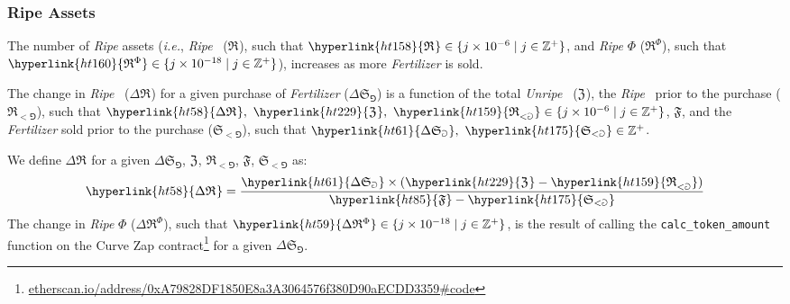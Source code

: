 \documentclass[tikz]{article}
\newcommand{\code}[1]{\texttt{#1}}
\newcommand{\term}[1]{\textsl{#1}}
\newcommand{\fref}[1]{\footnote{\href{http://#1}{#1}}}
\newcommand{\Bean}{} %
\newcommand{\bean}{} %
\begin{document}
\subsubsection{Ripe Assets}
The number of \term{Ripe} assets (\term{i.e.}, \term{Ripe} \Bean\ (\hyperlink{ht158}{$\mathfrak{R}^{\bean}$}), such that $\hyperlink{ht158}{\mathfrak{R}^{\bean}} \in \{j \times 10^{-6} \mid j \in \mathbb{Z}^{+} \}$, and \term{Ripe} \hyperlink{ht187}{$\Phi$} (\hyperlink{ht160}{$\mathfrak{R}^{\Phi}$}), such that $\hyperlink{ht160}{\mathfrak{R}^{\Phi}} \in \{j \times 10^{-18} \mid j \in \mathbb{Z}^{+} \}$), increases as more \term{Fertilizer} is sold.

The change in \term{Ripe} \Bean\ (\hyperlink{ht58}{$\Delta \mathfrak{R}^{\bean}$}) for a given purchase of \term{Fertilizer} (\hyperlink{ht61}{$\Delta \mathfrak{S}_{\Game}$}) is a function of the total \term{Unripe} \Bean\ (\hyperlink{ht229}{$\mathfrak{Z}^{\bean}$}), the \term{Ripe} \Bean\ prior to the purchase (\hyperlink{ht159}{$\mathfrak{R}_{<\Game}^{\bean}$}),  such that $\hyperlink{ht58}{\Delta \mathfrak{R}^{\bean}},\ \hyperlink{ht229}{\mathfrak{Z}^{\bean}},\ \hyperlink{ht159}{\mathfrak{R}_{<\Game}^{\bean}} \in \{j \times 10^{-6} \mid j \in \mathbb{Z}^{+} \}$, \hyperlink{ht85}{$\mathfrak{F}$}, and the \term{Fertilizer} sold prior to the purchase (\hyperlink{ht175}{$\mathfrak{S}_{<\Game}$}),  such that $\hyperlink{ht61}{\Delta \mathfrak{S}_{\Game}},\ \hyperlink{ht175}{\mathfrak{S}_{<\Game}} \in \mathbb{Z}^{+}$.

We define \hyperlink{ht58}{$\Delta \mathfrak{R}^{\bean}$} for a given \hyperlink{ht61}{$\Delta \mathfrak{S}_{\Game}$}, \hyperlink{ht229}{$\mathfrak{Z}^{\bean}$}, \hyperlink{ht159}{$\mathfrak{R}_{<\Game}^{\bean}$}, \hyperlink{ht85}{$\mathfrak{F}$}, \hyperlink{ht175}{$\mathfrak{S}_{<\Game}$} as:
$$\hyperlink{ht58}{\Delta \mathfrak{R}^{\bean}} = \frac{\hyperlink{ht61}{\Delta \mathfrak{S}_{\Game}} \times (\hyperlink{ht229}{\mathfrak{Z}^{\bean}} - \hyperlink{ht159}{\mathfrak{R}_{<\Game}^{\bean}})}{\hyperlink{ht85}{\mathfrak{F}} - \hyperlink{ht175}{\mathfrak{S}_{<\Game}}}$$
The change in \term{Ripe} \hyperlink{ht187}{$\Phi$} (\hyperlink{ht59}{$\Delta \mathfrak{R}^{\Phi}$}), such that $\hyperlink{ht59}{\Delta \mathfrak{R}^{\Phi}} \in \{j \times 10^{-18} \mid j \in \mathbb{Z}^{+} \}$, is the result of calling the \code{calc\_token\_amount} function on the Curve Zap contract\fref{etherscan.io/address/0xA79828DF1850E8a3A3064576f380D90aECDD3359\#code} for a given \hyperlink{ht61}{$\Delta \mathfrak{S}_{\Game}$}.
\end{document}
